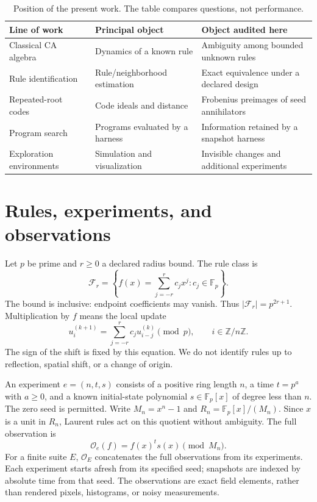 \documentclass{ijuc}
\newcommand{\Fp}{\mathbb F_p}
\newcommand{\Obs}{\mathcal O}
\begin{document}
\begin{table}[t]
\centering\small
\caption{Position of the present work. The table compares questions, not performance.}
\label{tab:position}
\begin{tabular}{@{}p{.27\linewidth}p{.30\linewidth}p{.35\linewidth}@{}}
\toprule
Line of work & Principal object & Object audited here\\\midrule
Classical CA algebra~\cite{martin1984} & Dynamics of a known rule & Ambiguity among bounded unknown rules\\
Rule identification~\cite{sun2011,zhao2006} & Rule/neighborhood estimation & Exact equivalence under a declared design\\
Repeated-root codes~\cite{castagnoli1991} & Code ideals and distance & Frobenius preimages of seed annihilators\\
Program search~\cite{funsearch,alphaevolve} & Programs evaluated by a harness & Information retained by a snapshot harness\\
Exploration environments~\cite{golly,sage,wolfram} & Simulation and visualization & Invisible changes and additional experiments\\\bottomrule
\end{tabular}
\end{table}

\section{Rules, experiments, and observations}
Let $p$ be prime and $r\geq0$ a declared radius bound. The rule class is
\begin{equation}
\mathcal F_r=\left\{f(x)=\sum_{j=-r}^{r}c_jx^j:c_j\in\Fp\right\}.
\end{equation}
The bound is inclusive: endpoint coefficients may vanish. Thus $|\mathcal F_r|=p^{2r+1}$. Multiplication by $f$ means the local update
\begin{equation}
 u_i^{(k+1)}=\sum_{j=-r}^{r}c_j u_{i-j}^{(k)}\pmod p,
 \qquad i\in\mathbb Z/n\mathbb Z.
 \label{eq:update}
\end{equation}
The sign of the shift is fixed by this equation. We do not identify rules up to reflection, spatial shift, or a change of origin.

An experiment $e=(n,t,s)$ consists of a positive ring length $n$, a time $t=p^a$ with $a\geq0$, and a known initial-state polynomial $s\in\Fp[x]$ of degree less than $n$. The zero seed is permitted. Write $M_n=x^n-1$ and $R_n=\Fp[x]/(M_n)$. Since $x$ is a unit in $R_n$, Laurent rules act on this quotient without ambiguity. The full observation is
\begin{equation}
 \Obs_e(f)=f(x)^t s(x)\pmod{M_n}.
 \label{eq:obs}
\end{equation}
For a finite suite $E$, $\Obs_E$ concatenates the full observations from its experiments. Each experiment starts afresh from its specified seed; snapshots are indexed by absolute time from that seed. The observations are exact field elements, rather than rendered pixels, histograms, or noisy measurements.
\end{document}
